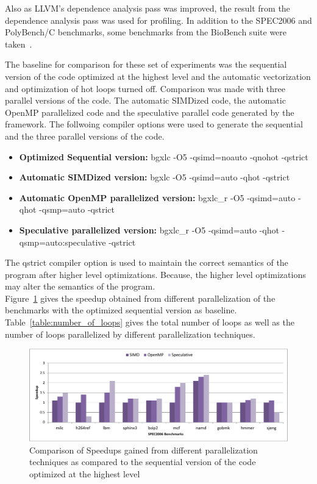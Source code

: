 \documentclass[10pt]{report}          %
\begin{document}
Also as LLVM's dependence analysis pass was improved, the result from the dependence analysis pass was used for profiling.  In addition to the SPEC2006 and PolyBench/C benchmarks, some benchmarks from the BioBench suite were taken~\cite{biobench}. 

The baseline for comparison for these set of experiments was the sequential version of the code optimized at the highest level and the automatic vectorization and optimization of hot loops turned off.  Comparison was made with three parallel versions of the code.  The automatic SIMDized code, the automatic OpenMP parallelized code and the speculative parallel code generated by the framework.  The follwoing compiler options were used to generate the sequential and the three parallel versions of the code. \\

\begin{itemize}
\item \textbf{Optimized Sequential version:} bgxlc -O5 -qsimd=noauto -qnohot -qstrict 
\item \textbf{Automatic SIMDized version:} bgxlc -O5 -qsimd=auto -qhot -qstrict 
\item \textbf{Automatic OpenMP parallelized version:} bgxlc\_r -O5 -qsimd=auto -qhot -qsmp=auto -qstrict 
\item \textbf{Speculative parallelized version:} bgxlc\_r -O5 -qsimd=auto -qhot -qsmp=auto:speculative -qstrict
\end{itemize}

The \-qstrict compiler option is used to maintain the correct semantics of the program after higher level optimizations.  Because, the higher level optimizations may alter the semantics of the program. \\

Figure~\ref{fig:speedup_O5} gives the speedup obtained from different parallelization of the benchmarks with the optimized sequential version as baseline. Table~\ref{table:number_of_loops} gives the total number of loops as well as the number of loops parallelized by different parallelization techniques.  
\begin{figure}
\centering
\includegraphics[scale=0.56]{./pdf/spec2006_O5.pdf}
\caption{Comparison of Speedups gained from different parallelization techniques as compared to the sequential version of the code optimized at the highest level }
\label{fig:speedup_O5}
\end{figure}
\end{document}
